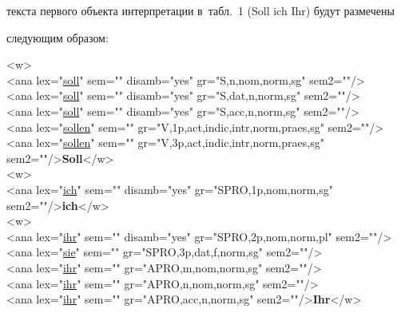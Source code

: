 текста первого объекта интерпретации в~табл.~1 (Soll ich Ihr) будут размечены 


следующим образом:





\medskip





\noindent


 {\footnotesize




   \ttfamily


<w>\\


<ana lex="\underline{soll}" sem="" disamb="yes" gr="S,n,nom,norm,sg" sem2=""/>\\


<ana lex="\underline{soll}" sem="" disamb="yes" gr="S,dat,n,norm,sg" sem2=""/>\\


<ana lex="\underline{soll}" sem="" disamb="yes" gr="S,acc,n,norm,sg" sem2=""/>\\


<ana lex="\underline{sollen}" sem="" gr="V,1p,act,indic,intr,norm,praes,sg" sem2=""/>\\


<ana lex="\underline{sollen}" sem="" gr="V,3p,act,indic,intr,norm,praes,sg"\\


\hspace*{10mm}sem2=""/>{\bf Soll}</w>\\


<w>\\


<ana lex="\underline{ich}" sem="" disamb="yes" gr="SPRO,1p,nom,norm,sg" sem2=""/>{\bf ich}</w>\\


<w>\\


<ana lex="\underline{ihr}" sem="" disamb="yes" gr="SPRO,2p,nom,norm,pl" sem2=""/>\\


<ana lex="\underline{sie}" sem="" gr="SPRO,3p,dat,f,norm,sg" sem2=""/>\\


<ana lex="\underline{ihr}" sem="" gr="APRO,m,nom,norm,sg" sem2=""/>\\


<ana lex="\underline{ihr}" sem="" gr="APRO,n,nom,norm,sg" sem2=""/>\\


<ana lex="\underline{ihr}" sem="" gr="APRO,acc,n,norm,sg" sem2=""/>{\bf Ihr}</w> 




}


